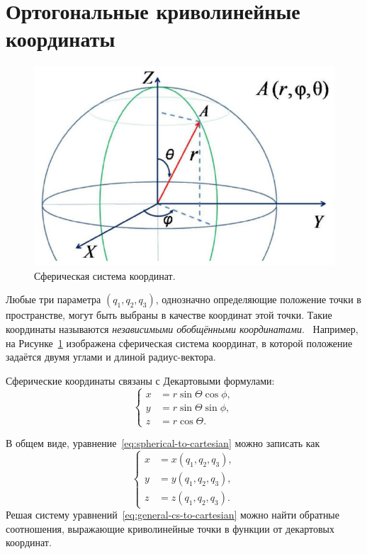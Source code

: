 \documentclass[12pt]{report}
\begin{document}
\section{Ортогональные криволинейные координаты}
\begin{figure}[h!]\centering
	\includegraphics[width=\linewidth]{spherical_cs}
	\caption{Сферическая система координат.\label{fig:spherical_cs}}
\end{figure}

Любые три параметра $(q_1,q_2,q_3)$, однозначно определяющие положение точки в пространстве, могут быть выбраны в качестве координат этой точки. Такие координаты называются \emph{независимыми обобщёнными координатами}.~\cite[стр.~5]{Alferov} Например, на Рисунке~\ref{fig:spherical_cs} изображена сферическая система координат, в которой положение задаётся двумя углами и длиной радиус-вектора. 

Сферические координаты связаны с Декартовыми формулами:
\begin{equation}\label{eq:spherical-to-cartesian}
	\begin{cases}
	x &= r\sin\Theta\cos\phi, \\
	y &= r\sin\Theta\sin\phi, \\
	z &= r\cos\Theta.
	\end{cases}
\end{equation}

В общем виде, уравнение~\eqref{eq:spherical-to-cartesian} можно записать как
\begin{equation}\label{eq:general-cs-to-cartesian}
	\begin{cases}
		x &= x(q_1,q_2,q_3), \\
		y &= y(q_1, q_2, q_3), \\
		z &= z(q_1, q_2, q_3).
	\end{cases}
\end{equation}
Решая систему уравнений~\eqref{eq:general-cs-to-cartesian} можно найти обратные соотношения, выражающие криволинейные точки в функции от декартовых координат.~\cite[стр.~5]{Alferov} 
\end{document}
